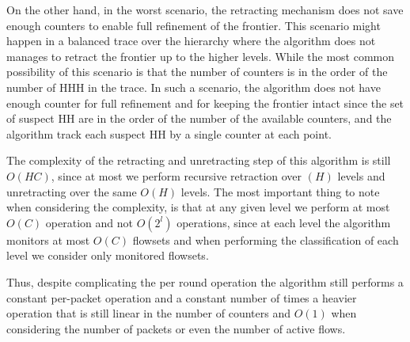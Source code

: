 On the other hand, in the worst scenario, the retracting mechanism does not save enough counters to enable full refinement of the frontier. This scenario might happen in a balanced trace over the hierarchy where the algorithm does not manages to retract the frontier up to the higher levels. While the most common possibility of this scenario is that the number of counters is in the order of the number of HHH in the trace. In such a scenario, the algorithm does not have enough counter for full refinement and for keeping the frontier intact since the set of suspect HH are in the order of the number of the available counters, and the algorithm track each suspect HH by a single counter at each point.

The complexity of the retracting and unretracting step of this algorithm is still $O(HC)$, since at most we perform recursive retraction over $(H)$ levels and unretracting over the same $O(H)$ levels. The most important thing to note when considering the complexity, is that at any given level we perform at most $O(C)$ operation and not $O(2^l)$ operations, since at each level the algorithm monitors at most $O(C)$ flowsets and when performing the classification of each level we consider only monitored flowsets.

Thus, despite complicating the per round operation the algorithm still performs a constant per-packet operation and a constant number of times a heavier operation that is still linear in the number of counters and $O(1)$ when considering the number of packets or even the number of active flows.

